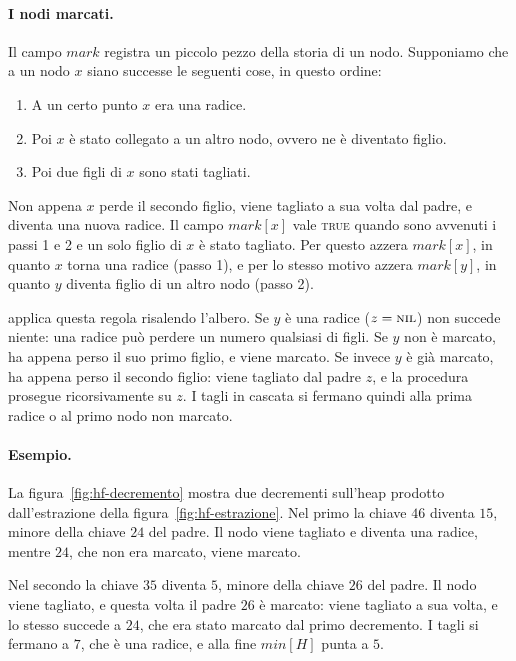 \paragraph{I nodi marcati.}
Il campo $\mathit{mark}$ registra un piccolo pezzo della storia di un nodo. Supponiamo che a un nodo $x$ siano successe le seguenti cose, in questo ordine:
\begin{enumerate}
    \item A un certo punto $x$ era una radice.
    \item Poi $x$ è stato collegato a un altro nodo, ovvero ne è diventato figlio.
    \item Poi due figli di $x$ sono stati tagliati.
\end{enumerate}

Non appena $x$ perde il secondo figlio, viene tagliato a sua volta dal padre, e diventa una nuova radice. Il campo $\mathit{mark}[x]$ vale \textsc{true} quando sono avvenuti i passi 1 e 2 e un solo figlio di $x$ è stato tagliato. Per questo \Cut{} azzera $\mathit{mark}[x]$, in quanto $x$ torna una radice (passo 1), e per lo stesso motivo \FibHeapLink{} azzera $\mathit{mark}[y]$, in quanto $y$ diventa figlio di un altro nodo (passo 2).

\CascadingCut{} applica questa regola risalendo l'albero. Se $y$ è una radice ($z = \textsc{nil}$) non succede niente: una radice può perdere un numero qualsiasi di figli. Se $y$ non è marcato, ha appena perso il suo primo figlio, e viene marcato. Se invece $y$ è già marcato, ha appena perso il secondo figlio: viene tagliato dal padre $z$, e la procedura prosegue ricorsivamente su $z$. I tagli in cascata si fermano quindi alla prima radice o al primo nodo non marcato.

\paragraph{Esempio.}
La figura~\ref{fig:hf-decremento} mostra due decrementi sull'heap prodotto dall'estrazione della figura~\ref{fig:hf-estrazione}. Nel primo la chiave $46$ diventa $15$, minore della chiave $24$ del padre. Il nodo viene tagliato e diventa una radice, mentre $24$, che non era marcato, viene marcato.

Nel secondo la chiave $35$ diventa $5$, minore della chiave $26$ del padre. Il nodo viene tagliato, e questa volta il padre $26$ è marcato: viene tagliato a sua volta, e lo stesso succede a $24$, che era stato marcato dal primo decremento. I tagli si fermano a $7$, che è una radice, e alla fine $\mathit{min}[H]$ punta a $5$.

